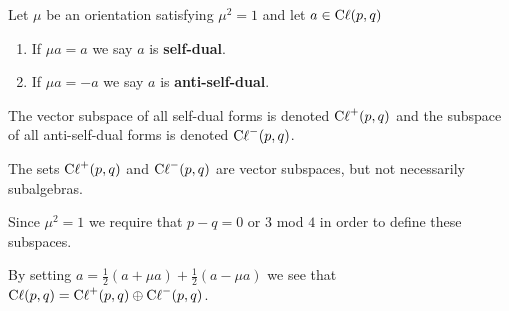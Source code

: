 \begin{defn}
Let $\mu$ be an orientation satisfying $\mu^2 = 1$ and let $a\in \operatorname{C\ell}(p,q)$
\begin{enumerate}
    \item If $\mu a = a$ we say $a$ is \textbf{self-dual}.
    \item If $\mu a = -a$ we say $a$ is \textbf{anti-self-dual}.
\end{enumerate}
The vector subspace of all self-dual forms is denoted $\operatorname{C\ell}^+(p,q)$ and the subspace of all anti-self-dual forms is denoted $\operatorname{C\ell}^-(p,q)$.
\end{defn}
\begin{remark*}
    The sets $\operatorname{C\ell}^+(p,q)$ and $\operatorname{C\ell}^-(p,q)$ are vector subspaces, but not necessarily subalgebras.
\end{remark*}
\begin{remark*}
    Since $\mu^2 = 1$ we require that $p-q=0$ or $3$ mod $4$ in order to define these subspaces.
\end{remark*}
\begin{remark*}
    By setting $a = \frac{1}{2}(a+\mu a) + \frac{1}{2}(a-\mu a)$ we see that $\operatorname{C\ell}(p,q) = \operatorname{C\ell}^+(p,q) \oplus \operatorname{C\ell}^-(p,q)$.
\end{remark*}


